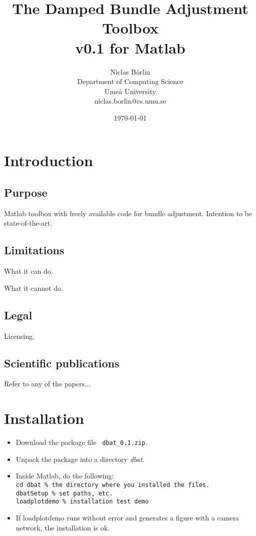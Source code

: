\documentclass{article}
\begin{document}
\newcommand{\dbatversion}{0.1}

\title{The Damped Bundle Adjustment Toolbox\\v\dbatversion{} for Matlab}
\author{Niclas B{\"o}rlin\\Department of Computing Science\\Ume{\aa}
  University\\niclas.borlin@cs.umu.se}
\date{\today}

\maketitle

\tableofcontents

\section{Introduction}

\subsection{Purpose}

Matlab toolbox with freely available code for bundle adjustment.
Intention to be state-of-the-art.

\subsection{Limitations}

What it can do.

What it cannot do.

\subsection{Legal}

Licensing.

\subsection{Scientific publications}

Refer to any of the papers...

\section{Installation}

\begin{itemize}
\item Download the package file {\tt
  \verb+dbat_+\dbatversion\verb+.zip+}.
\item Unpack the package into a directory \emph{dbat}.
\item Inside Matlab, do the following:\\
\verb+cd dbat % the directory where you installed the files.+\\
\verb+dbatSetup % set paths, etc.+\\
\verb+loadplotdemo % installation test demo+
\item If loadplotdemo runs without error and generates a figure with a
  camera network, the installation is ok.
\end{itemize}
\end{document}
